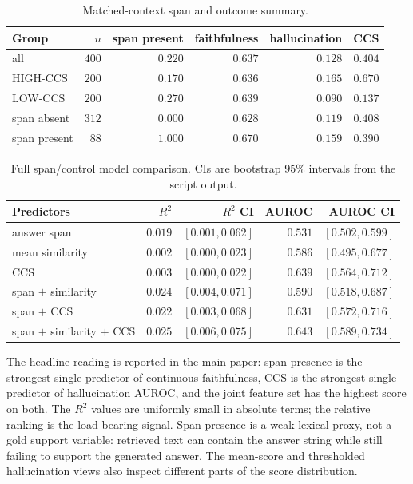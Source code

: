 \documentclass[11pt]{article}
\begin{document}
\begin{table}[!htb]
\centering
\caption{Matched-context span and outcome summary.}
\footnotesize
\begin{tabular}{lrrrrr}
\toprule
Group & $n$ & span present & faithfulness & hallucination & CCS \\
\midrule
all          & $400$ & $0.220$ & $0.637$ & $0.128$ & $0.404$ \\
HIGH-CCS     & $200$ & $0.170$ & $0.636$ & $0.165$ & $0.670$ \\
LOW-CCS      & $200$ & $0.270$ & $0.639$ & $0.090$ & $0.137$ \\
span absent  & $312$ & $0.000$ & $0.628$ & $0.119$ & $0.408$ \\
span present & $\phantom{1}88$ & $1.000$ & $0.670$ & $0.159$ & $0.390$ \\
\bottomrule
\end{tabular}
\end{table}

\begin{table}[!htb]
\centering
\caption{Full span/control model comparison. CIs are bootstrap $95\%$
intervals from the script output.}
\footnotesize
\begin{tabular}{lrrrr}
\toprule
Predictors & $R^2$ & $R^2$ CI & AUROC & AUROC CI \\
\midrule
answer span                   & $0.019$ & $[0.001, 0.062]$ & $0.531$ & $[0.502, 0.599]$ \\
mean similarity               & $0.002$ & $[0.000, 0.023]$ & $0.586$ & $[0.495, 0.677]$ \\
CCS                           & $0.003$ & $[0.000, 0.022]$ & $0.639$ & $[0.564, 0.712]$ \\
span $+$ similarity           & $0.024$ & $[0.004, 0.071]$ & $0.590$ & $[0.518, 0.687]$ \\
span $+$ CCS                  & $0.022$ & $[0.003, 0.068]$ & $0.631$ & $[0.572, 0.716]$ \\
span $+$ similarity $+$ CCS   & $0.025$ & $[0.006, 0.075]$ & $0.643$ & $[0.589, 0.734]$ \\
\bottomrule
\end{tabular}
\end{table}

The headline reading is reported in the main paper: span presence is
the strongest single predictor of continuous faithfulness, CCS is the
strongest single predictor of hallucination AUROC, and the joint
feature set has the highest score on both. The $R^2$ values are uniformly small in
absolute terms; the relative ranking is the load-bearing signal.
Span presence is a weak lexical proxy, not a gold support variable:
retrieved text can contain the answer string while still failing to
support the generated answer. The mean-score and thresholded
hallucination views also inspect different parts of the score
distribution.
\end{document}
